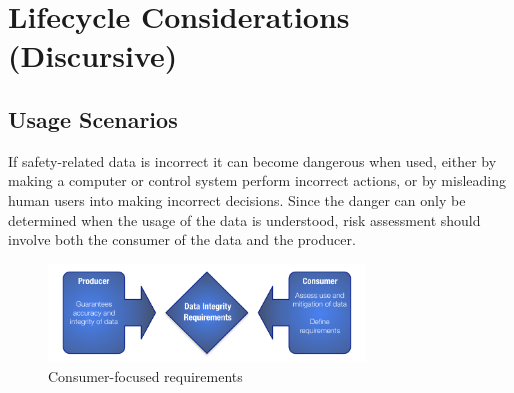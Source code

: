 %
%
\section{Lifecycle Considerations (Discursive)} \label{bkm:lifecycle}


\subsection{Usage Scenarios}
If safety-related data is incorrect it can become dangerous when used, either by making a computer or control system perform incorrect actions, or by misleading human users into making incorrect decisions. Since the danger can only be determined when the usage of the data is understood, risk assessment should involve both the consumer of the data and the producer.

\begin{figure}[htbp]
  \centering
  \includegraphics[width=0.75\textwidth]{images/producerconsumer}
  \caption{Consumer-focused  requirements}
  \label{fig:producerconsumer}
\end{figure}


